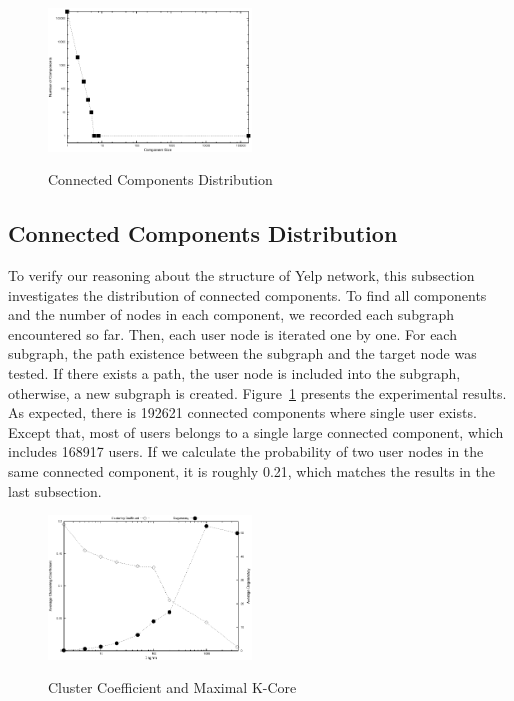 \documentclass[10pt]{sig-alternate-10pt}   	%
\begin{document}
\begin{figure}[t]
  \centering
  \caption{Connected Components Distribution} 
       \includegraphics[width=0.48\textwidth]{figures/ccd.eps}
  \label{fig:ccd}
\end{figure}   

\subsection{Connected Components Distribution}
To verify our reasoning about the structure of Yelp network, this subsection investigates the distribution of connected 
components. To find all components and the number of nodes in each component, we recorded each subgraph encountered 
so far.  Then, each user node is iterated one by one. For each subgraph, the path existence between the subgraph and 
the target node was tested. If there exists a path, the user node is included into the subgraph, otherwise, a new subgraph is
created. Figure~\ref{fig:ccd} presents the experimental results. As expected, there is 192621 connected components where
single user exists. Except that, most of users belongs to a single large connected component, which includes 168917 users. 
If we calculate the probability of two user nodes in the same connected component, it is roughly 0.21, which matches
the results in the last subsection.  

\begin{figure}[t]
  \centering
  \caption{Cluster Coefficient and Maximal K-Core} 
       \includegraphics[width=0.48\textwidth]{figures/coefficient.eps}
  \label{fig:coefficient}
\end{figure}  
\end{document}
